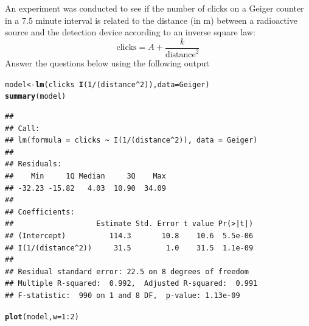 \documentclass[twoside]{book}\usepackage[]{graphicx}\usepackage[]{xcolor}
\makeatletter
\newcommand{\hlnum}[1]{\textcolor[rgb]{0.686,0.059,0.569}{#1}}%
\newcommand{\hlopt}[1]{\textcolor[rgb]{0,0,0}{#1}}%
\newcommand{\hlstd}[1]{\textcolor[rgb]{0.345,0.345,0.345}{#1}}%
\newcommand{\hlkwb}[1]{\textcolor[rgb]{0.69,0.353,0.396}{#1}}%
\newcommand{\hlkwc}[1]{\textcolor[rgb]{0.333,0.667,0.333}{#1}}%
\newcommand{\hlkwd}[1]{\textcolor[rgb]{0.737,0.353,0.396}{\textbf{#1}}}%
\newenvironment{kframe}{%
 \def\at@end@of@kframe{}%
 \ifinner\ifhmode%
  \def\at@end@of@kframe{\end{minipage}}%
  \begin{minipage}{\columnwidth}%
 \fi\fi%
 \def\FrameCommand##1{\hskip\@totalleftmargin \hskip-\fboxsep
 \colorbox{shadecolor}{##1}\hskip-\fboxsep
     \hskip-\linewidth \hskip-\@totalleftmargin \hskip\columnwidth}%
 \MakeFramed {\advance\hsize-\width
   \@totalleftmargin\z@ \linewidth\hsize
   \@setminipage}}%
 {\par\unskip\endMakeFramed%
 \at@end@of@kframe}
\newenvironment{knitrout}{}{} %
\makeatother
\begin{document}
\begin{problem}
	An experiment was conducted to see if the number of clicks 
	on a Geiger counter in a 7.5 minute interval is related to
	the distance (in m) between a radioactive source and the detection 
	device according to an inverse square law:
	\[
	\mbox{clicks} =	A + \frac{k}{\mbox{distance}^{2}}
	\]
	Answer the questions below using the following output

\begin{knitrout}
\color{fgcolor}\begin{kframe}
\begin{alltt}
\hlstd{model} \hlkwb{<-} \hlkwd{lm}\hlstd{( clicks} \hlopt{~} \hlkwd{I}\hlstd{(}\hlnum{1}\hlopt{/}\hlstd{(distance}\hlopt{^}\hlnum{2}\hlstd{)),} \hlkwc{data} \hlstd{= Geiger)}
\hlkwd{summary}\hlstd{(model)}
\end{alltt}
\begin{verbatim}
## 
## Call:
## lm(formula = clicks ~ I(1/(distance^2)), data = Geiger)
## 
## Residuals:
##    Min     1Q Median     3Q    Max 
## -32.23 -15.82   4.03  10.90  34.09 
## 
## Coefficients:
##                   Estimate Std. Error t value Pr(>|t|)
## (Intercept)          114.3       10.8    10.6  5.5e-06
## I(1/(distance^2))     31.5        1.0    31.5  1.1e-09
## 
## Residual standard error: 22.5 on 8 degrees of freedom
## Multiple R-squared:  0.992,	Adjusted R-squared:  0.991 
## F-statistic:  990 on 1 and 8 DF,  p-value: 1.13e-09
\end{verbatim}
\begin{alltt}
\hlkwd{plot}\hlstd{(model,} \hlkwc{w} \hlstd{=} \hlnum{1}\hlopt{:}\hlnum{2}\hlstd{)}
\end{alltt}
\end{kframe}


\end{knitrout}
\end{problem}
\end{document}
